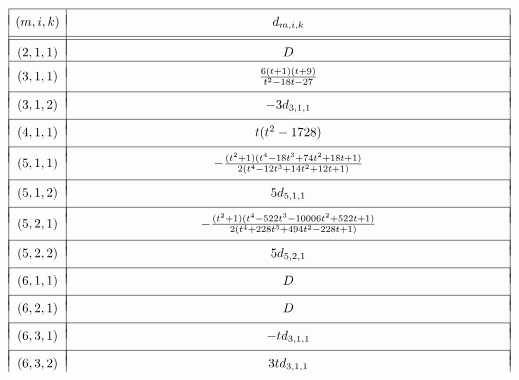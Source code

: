 \begin{table}[!ht]
\[
\begin{array}{|c|c|} 
\hline
 &  \\ [-.75 em]
(m,i ,k ) & 
\hphantom{0000000000000000000000000000000} d_{m,i, k} \hphantom{0000000000000000000000000000000}\\
 &  \\ [-.75 em]
\hline
\hline
& \\ [-.75em]
(2,1,1) & D \\
\hline
& \\ [-.75em]
(3,1,1) & \frac{6(t+1)(t+9)}{t^2 - 18t - 27} \\
& \\ [-.75em]
\hline 
& \\ [-.75em]
(3,1,2) & - 3 d_{3,1,1} \\
& \\ [-.75em]
\hline 
& \\ [-.75em]
(4,1,1) & t(t^2-1728)\\
& \\ [-.75em]
\hline 
& \\ [-.75em]
(5,1,1) & - \frac{(t^2+1)(t^4 - 18t^3 + 74t^2 + 18t + 1)}{2(t^4 - 12t^3 + 14t^2 + 12t + 1)} \\
& \\ [-.75em]
\hline 
& \\ [-.75em]
(5,1,2) & 5 d_{5,1,1}\\
& \\ [-.75em]
\hline
& \\ [-.75em]
(5,2,1) & - \frac{(t^2+1)(t^4 - 522t^3 - 10006t^2 + 522t + 1)}{2(t^4 + 228t^3 + 494t^2 - 228t + 1)} \\
& \\ [-.75em]
\hline
& \\ [-.75em]
(5,2,2) & 5 d_{5,2,1} \\
& \\ [-.75em]
\hline
& \\ [-.75em]
(6,1,1) & D \\
& \\ [-.75em]
\hline
& \\ [-.75em]
(6,2,1) & D \\
& \\ [-.75em]
\hline
& \\ [-.75em]
(6,3,1) & - t d_{3,1,1} \\
& \\ [-.75em]
\hline
& \\ [-.75em]
(6,3,2) & 3t d_{3,1,1} \\

\end{array}\]
\end{table}
